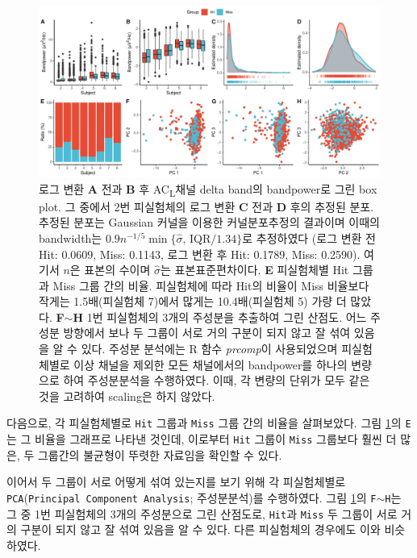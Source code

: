 \documentclass[11pt,onecolumn,twoside,a4size]{gsag3jnl}
\newcommand{\ACL}{AC\textsubscript{L}}
\begin{document}
\begin{figure}[tp]
  \renewcommand{\familydefault}{\sfdefault}\normalfont
  \centering
  \includegraphics[width=\linewidth]{EDA.pdf}
  \caption{\small 로그 변환 \textbf{A} 전과 \textbf{B} 후 \ACL 채널 delta band의 bandpower로 그린 box plot. 그 중에서 2번 피실험체의 로그 변환 \textbf{C} 전과 \textbf{D} 후의 추정된 분포. 추정된 분포는 Gaussian 커널을 이용한 커널분포추정의 결과이며 이때의 bandwidth는 $0.9n^{-1/5}\min\{\widehat{\sigma},\,\mathrm{IQR}/1.34\}$로 추정하였다 (로그 변환 전 Hit: 0.0609, Miss: 0.1143, 로그 변환 후 Hit: 0.1789, Miss: 0.2590). 여기서 $n$은 표본의 수이며 $\widehat{\sigma}$는 표본표준편차이다. \textbf{E} 피실험체별 {Hit} 그룹과 {Miss} 그룹 간의 비율. 피실험체에 따라 {Hit}의 비율이 {Miss} 비율보다 작게는 1.5배(피실험체 7)에서 많게는 10.4배(피실험체 5) 가량 더 많았다. \textbf{F}$\sim$\textbf{H} 1번 피실험체의 3개의 주성분을 추출하여 그린 산점도. 어느 주성분 방향에서 보나 두 그룹이 서로 거의 구분이 되지 않고 잘 섞여 있음을 알 수 있다. 주성분 분석에는 R 함수 \textrm{\textit{prcomp}}이 사용되었으며 피실험체별로 이상 채널을 제외한 모든 채널에서의 bandpower를 하나의 변량으로 하여 주성분분석을 수행하였다. 이때, 각 변량의 단위가 모두 같은 것을 고려하여 scaling은 하지 않았다.}
  \label{fig:EDA}
\end{figure}

다음으로, 각 피실험체별로 \texttt{Hit} 그룹과 \texttt{Miss} 그룹 간의 비율을 살펴보았다. 그림 \ref{fig:EDA}의 \texttt{E}는 그 비율을 그래프로 나타낸 것인데, 이로부터 \texttt{Hit} 그룹이 \texttt{Miss} 그룹보다 훨씬 더 많은, 두 그룹간의 불균형이 뚜렷한 자료임을 확인할 수 있다.

이어서 두 그룹이 서로 어떻게 섞여 있는지를 보기 위해 각 피실험체별로 \texttt{PCA}(\texttt{Principal Component Analysis}; 주성분분석)를 수행하였다. 그림 \ref{fig:EDA}의 \texttt{F}$\sim$\texttt{H}는 그 중 1번 피실험체의 3개의 주성분으로 그린 산점도로, \texttt{Hit}과 \texttt{Miss} 두 그룹이 서로 거의 구분이 되지 않고 잘 섞여 있음을 알 수 있다. 다른 피실험체의 경우에도 이와 비슷하였다.
\end{document}

